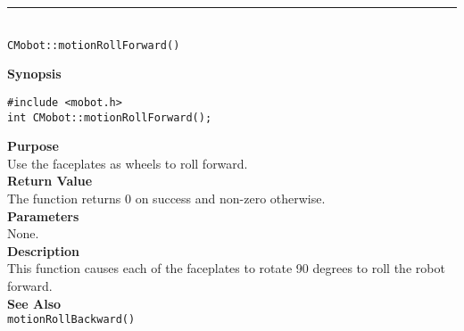 \noindent
\vspace{5pt}
\rule{4.5in}{0.015in}\\
\noindent
{\LARGE \texttt{CMobot::motionRollForward()}}\\
{}

\noindent
{\bf Synopsis}\\
\begin{verbatim}
#include <mobot.h>
int CMobot::motionRollForward();
\end{verbatim}

\noindent
{\bf Purpose}\\
Use the faceplates as wheels to roll forward.\\

\noindent
{\bf Return Value}\\
The function returns 0 on success and non-zero otherwise.\\

\noindent
{\bf Parameters}\\
None.\\

\noindent
{\bf Description}\\
This function causes each of the faceplates to rotate 90 degrees to roll the
robot forward.\\

\noindent
{\bf See Also}\\
\texttt{motionRollBackward()}

